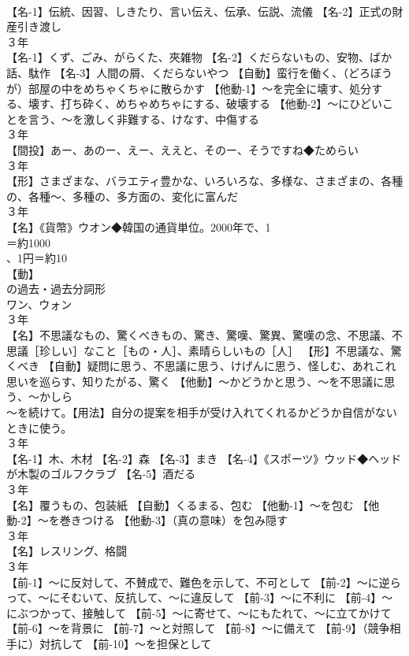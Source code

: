 \documentclass[8pt]{extreport}
\begin{document}
\begin{CJK}{UTF8}{min}
\\	【名-1】伝統、因習、しきたり、言い伝え、伝承、伝説、流儀 【名-2】正式の財産引き渡し
\\	３年	
\\	【名-1】くず、ごみ、がらくた、夾雑物 【名-2】くだらないもの、安物、ばか話、駄作 【名-3】人間の屑、くだらないやつ 【自動】蛮行を働く、（どろぼうが）部屋の中をめちゃくちゃに散らかす 【他動-1】～を完全に壊す、処分する、壊す、打ち砕く、めちゃめちゃにする、破壊する 【他動-2】～にひどいことを言う、～を激しく非難する、けなす、中傷する
\\	３年	
\\	【間投】あー、あのー、えー、ええと、そのー、そうですね◆ためらい
\\	３年	
\\	【形】さまざまな、バラエティ豊かな、いろいろな、多様な、さまざまの、各種の、各種～、多種の、多方面の、変化に富んだ
\\	３年	
\\	【名】《貨幣》ウオン◆韓国の通貨単位。2000年で、1 
\\	＝約1000 
\\	、1円＝約10 
\\	【動】
\\	の過去・過去分詞形 
\\	ワン、ウォン
\\	３年	
\\	【名】不思議なもの、驚くべきもの、驚き、驚嘆、驚異、驚嘆の念、不思議、不思議［珍しい］なこと［もの・人］、素晴らしいもの［人］ 【形】不思議な、驚くべき 【自動】疑問に思う、不思議に思う、けげんに思う、怪しむ、あれこれ思いを巡らす、知りたがる、驚く 【他動】～かどうかと思う、～を不思議に思う、～かしら
\\	～を続けて。【用法】自分の提案を相手が受け入れてくれるかどうか自信がないときに使う。
\\	３年	
\\	【名-1】木、木材 【名-2】森 【名-3】まき 【名-4】《スポーツ》ウッド◆ヘッドが木製のゴルフクラブ 【名-5】酒だる
\\	３年	
\\	【名】覆うもの、包装紙 【自動】くるまる、包む 【他動-1】～を包む 【他動-2】～を巻きつける 【他動-3】（真の意味）を包み隠す
\\	３年	
\\	【名】レスリング、格闘
\\	３年	
\\	【前-1】～に反対して、不賛成で、難色を示して、不可として 【前-2】～に逆らって、～にそむいて、反抗して、～に違反して 【前-3】～に不利に 【前-4】～にぶつかって、接触して 【前-5】～に寄せて、～にもたれて、～に立てかけて 【前-6】～を背景に 【前-7】～と対照して 【前-8】～に備えて 【前-9】（競争相手に）対抗して 【前-10】～を担保として

\end{CJK}
\end{document}

